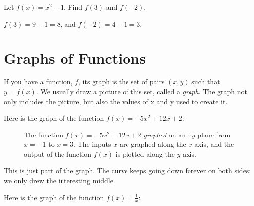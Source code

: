 \begin{Worked}
\begin{Problem}
Let $f(x) = x^2 - 1$. Find $f(3)$ and $f(-2)$.
\end{Problem}
\begin{Solution}
$f(3) = 9 - 1 = 8$, and $f(-2) = 4 - 1 = 3$.
\end{Solution}
\end{Worked}

\section{Graphs of Functions}

If you have a function, $f$, its graph is the set of pairs $(x, y)$
such that $y = f(x)$.  We usually draw a picture of this set, called a \textit{graph}.
The graph not only includes the picture, but also the values of x and y used to create it.

Here is the graph of the function $f(x) = -5x^2 + 12x + 2$:
\begin{figure}[H]
  \centering
  \caption{The function $f(x) = -5x^2 + 12x + 2$ \textit{graphed} on an $xy$-plane from $x=-1$ to $x=3$. The inputs $x$ are graphed along the $x$-axis, and the output of the function $f(x)$ is plotted along the $y$-axis.}
  \label{fig:graphed1}
\end{figure}


This is just part of the graph. The curve keeps going down forever on
both sides; we only drew the interesting middle.

Here is the graph of the function $f(x) = \frac{1}{x}$:

